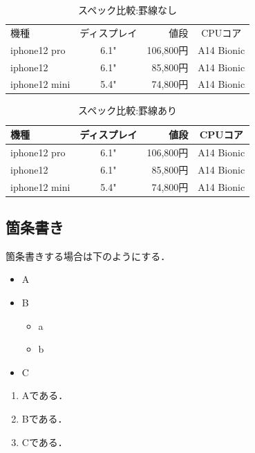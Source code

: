 \documentclass[titlepage,12pt,a4paper]{jarticle}
\begin{document}
\begin{table}[htb]
	\centering
	 \caption{スペック比較:罫線なし}
	  \begin{tabular}{lcrc}
		機種 & ディスプレイ & 値段 & CPUコア \\
		iphone12 pro & 6.1" & 106,800円 & A14 Bionic \\
		iphone12 & 6.1" & 85,800円 & A14 Bionic \\
		iphone12 mini & 5.4" & 74,800円 & A14 Bionic
	  \end{tabular}
	  \label{tab:sample01}
	\end{table}



	\begin{table}[htb]
		\centering
		  \caption{スペック比較:罫線あり}
		  \begin{tabular}{|l||c|r|c|}  \hline
			機種 & ディスプレイ & 値段 & CPUコア \\ \hline \hline
			iphone12 pro & 6.1" & 106,800円 & A14 Bionic \\ \hline
			iphone12 & 6.1" & 85,800円 & A14 Bionic \\ \hline
			iphone12 mini & 5.4" & 74,800円 & A14 Bionic \\ \hline
		  \end{tabular}
		  \label{tab:sample02}
		\end{table}


\subsection{箇条書き}
箇条書きする場合は下のようにする．
\begin{itemize}
	\item A
	\item B
	\begin{itemize}
		\item a
		\item b    
	\end{itemize}
	\item C	
\end{itemize}

\begin{enumerate}
	\item Aである．
	\item Bである．
	\item Cである．
\end{enumerate}
\end{document}
